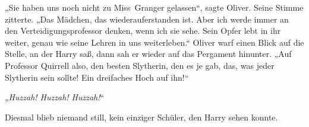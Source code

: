 „Sie haben uns noch nicht zu Miss~Granger gelassen“, sagte Oliver. Seine Stimme zitterte. „Das Mädchen, das wiederauferstanden ist. Aber ich werde immer an den Verteidigungsprofessor denken, wenn ich sie sehe. Sein Opfer lebt in ihr weiter, genau wie seine Lehren in uns weiterleben.“ Oliver warf einen Blick auf die Stelle, an der Harry saß, dann sah er wieder auf das Pergament hinunter. „Auf Professor Quirrell also, den besten Slytherin, den es je gab, das, was jeder Slytherin sein sollte! Ein dreifaches Hoch auf ihn!“

„\emph{Huzzah! Huzzah! Huzzah!}“

Diesmal blieb niemand still, kein einziger Schüler, den Harry sehen konnte.

